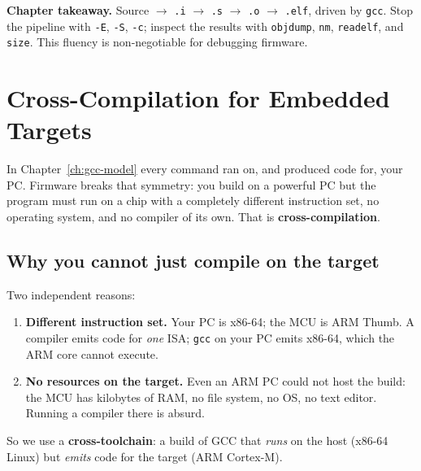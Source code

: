 \documentclass[11pt,a4paper,oneside]{book}
\newcommand{\code}[1]{\texttt{#1}}
\begin{document}
\begin{keyidea}
\textbf{Chapter takeaway.} Source $\to$ \code{.i} $\to$ \code{.s} $\to$
\code{.o} $\to$ \code{.elf}, driven by \code{gcc}. Stop the pipeline with
\code{-E}, \code{-S}, \code{-c}; inspect the results with \code{objdump},
\code{nm}, \code{readelf}, and \code{size}. This fluency is non-negotiable for
debugging firmware.
\end{keyidea}

\chapter{Cross-Compilation for Embedded Targets}
\label{ch:cross}

In Chapter~\ref{ch:gcc-model} every command ran on, and produced code for, your
PC. Firmware breaks that symmetry: you build on a powerful PC but the program
must run on a chip with a completely different instruction set, no operating
system, and no compiler of its own. That is \textbf{cross-compilation}.

\section{Why you cannot just compile on the target}
Two independent reasons:
\begin{enumerate}[leftmargin=1.4cm]
  \item \textbf{Different instruction set.} Your PC is x86-64; the MCU is ARM
        Thumb. A compiler emits code for \emph{one} ISA; \code{gcc} on your PC
        emits x86-64, which the ARM core cannot execute.
  \item \textbf{No resources on the target.} Even an ARM PC could not host the
        build: the MCU has kilobytes of RAM, no file system, no OS, no text
        editor. Running a compiler there is absurd.
\end{enumerate}
So we use a \textbf{cross-toolchain}: a build of GCC that \emph{runs} on the
host (x86-64 Linux) but \emph{emits} code for the target (ARM Cortex-M).
\end{document}
